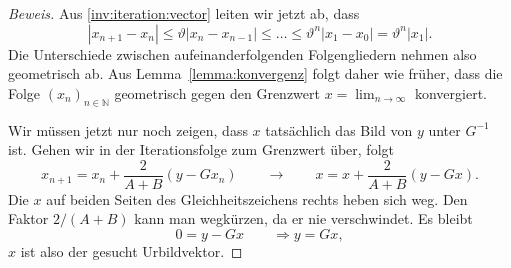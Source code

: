 \begin{proof}[Beweis]
Aus \eqref{inv:iteration:vector} leiten wir jetzt ab, dass
\[
|x_{n+1} - x_n|
\le \vartheta |x_n-x_{n-1}|
\le \dots \le \vartheta^n |x_1-x_0|=\vartheta^n |x_1|.
\]
Die Unterschiede zwischen aufeinanderfolgenden Folgengliedern
nehmen also geometrisch ab.
Aus Lemma~\ref{lemma:konvergenz} folgt daher wie früher, dass
die Folge $(x_n)_{n\in\mathbb N}$ geometrisch gegen den Grenzwert
$x=\lim_{n\to\infty}$
konvergiert.

Wir müssen jetzt nur noch zeigen, dass $x$ tatsächlich das Bild von $y$
unter $G^{-1}$ ist.
Gehen wir in der Iterationsfolge zum Grenzwert über, folgt
\[
x_{n+1} = x_n + \frac{2}{A+B}(y-Gx_n)
\qquad\rightarrow\qquad
x = x + \frac{2}{A+B}(y-Gx).
\]
Die $x$ auf beiden Seiten des Gleichheitszeichens rechts
heben sich weg.
Den Faktor $2/(A+B)$ kann man wegkürzen, da er nie verschwindet.
Es bleibt
\[
0
=
y-Gx
\qquad
\Rightarrow
y=Gx,
\]
$x$ ist also der gesucht Urbildvektor.
\end{proof}

